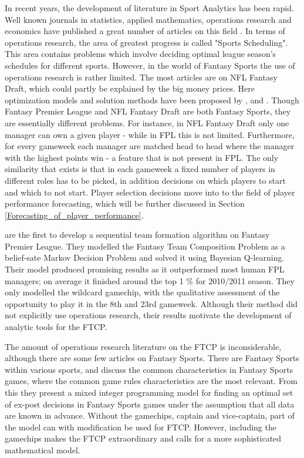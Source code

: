 In recent years, the development of literature in Sport Analytics has been rapid. Well known journals in statistics, applied mathematics, operations research and economics have published a great number of articles on this field \citep{Coleman}. In terms of operations research, the area of greatest progress is called "Sports Scheduling". This area contains problems which involve deciding optimal league season's schedules for different sports. However, in the world of Fantasy Sports the use of operations research is rather limited. The most articles are on NFL Fantasy Draft, which could partly be explained by the big money prices. Here optimization models and solution methods have been proposed by \cite{Fry}, \cite{Gibson} and \cite{Becker}. Though Fantasy Premier League and NFL Fantasy Draft are both Fantasy Sports, they are essentially different problems. For instance, in NFL Fantasy Draft
only one manager can own a given player - while in FPL this is not limited. Furthermore, for every gameweek each manager are matched head to head where the manager with the highest points win - a feature that is not present in FPL. The only similarity that exists is that in each gameweek a fixed number of players in different roles has to be picked, in addition decisions on which players to start and which to not start. Player selection decisions move into to the field of player performance forecasting, which will be further discussed in Section \ref{Forecasting_of_player_performance}.


\newpar

\cite{Matthews} are the first to develop a sequential team formation algorithm on Fantasy Premier League. They modelled the Fantasy Team Composition Problem as a belief-sate Markov Decision Problem and solved it using Bayesian Q-learning. Their model produced promising results as it outperformed most human FPL managers; on average it finished around the top 1 \% for 2010/2011 season. They only modelled the wildcard gamechip, with the qualitative assessment of the opportunity to play it in the 8th and 23rd gameweek. Although their method did not explicitly use operations research, their results motivate the development of analytic tools for the FTCP. 

\newpar

The amount of operations research literature on the FTCP is inconsiderable, although there are some few articles on Fantasy Sports. There are Fantasy Sports within various sports, and \cite{Mathsports} discuss the common characteristics in Fantasy Sports games, where the common game rules characteristics are the most relevant. From this they present a mixed integer programming model for finding an optimal set of ex-post decisions in Fantasy Sports games under the assumption that all data are known in advance. Without the gamechips, captain and vice-captain, part of the model can with modification be used for FTCP. However, including the gamechips makes the FTCP extraordinary and calls for a more sophisticated mathematical model. 

